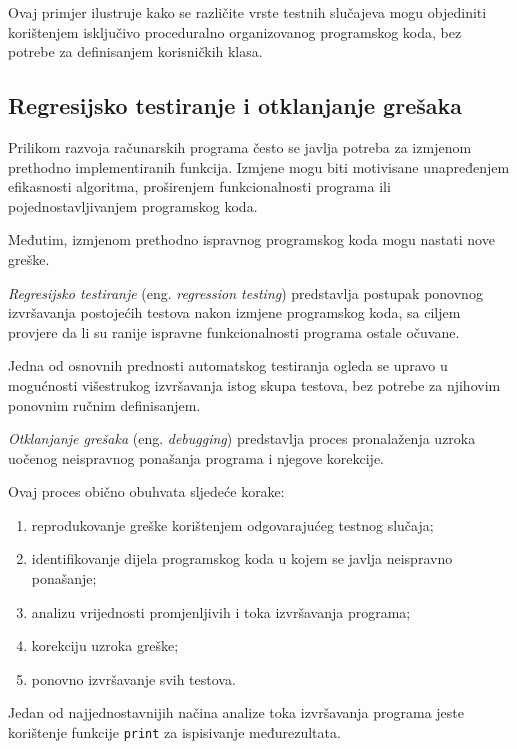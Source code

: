 Ovaj primjer ilustruje kako se različite vrste 
testnih slučajeva mogu objediniti korištenjem 
isključivo proceduralno organizovanog programskog 
koda, bez potrebe za definisanjem korisničkih klasa.


\subsection{Regresijsko testiranje i otklanjanje grešaka}

Prilikom razvoja računarskih programa često se 
javlja potreba za izmjenom prethodno implementiranih 
funkcija. Izmjene mogu biti motivisane unapređenjem 
efikasnosti algoritma, proširenjem funkcionalnosti 
programa ili pojednostavljivanjem programskog koda.

Međutim, izmjenom prethodno ispravnog programskog 
koda mogu nastati nove greške.

\textit{Regresijsko testiranje} (eng. \emph{regression 
	testing}) predstavlja postupak ponovnog izvršavanja 
postojećih testova nakon izmjene programskog koda, 
sa ciljem provjere da li su ranije ispravne 
funkcionalnosti programa ostale očuvane.

Jedna od osnovnih prednosti automatskog testiranja 
ogleda se upravo u mogućnosti višestrukog izvršavanja 
istog skupa testova, bez potrebe za njihovim ponovnim 
ručnim definisanjem.

\textit{Otklanjanje grešaka} (eng. \emph{debugging}) 
predstavlja proces pronalaženja uzroka uočenog 
neispravnog ponašanja programa i njegove korekcije.

Ovaj proces obično obuhvata sljedeće korake:

\begin{enumerate}
	\item reprodukovanje greške korištenjem 
	odgovarajućeg testnog slučaja;
	
	\item identifikovanje dijela programskog koda 
	u kojem se javlja neispravno ponašanje;
	
	\item analizu vrijednosti promjenljivih i toka 
	izvršavanja programa;
	
	\item korekciju uzroka greške;
	
	\item ponovno izvršavanje svih testova.
\end{enumerate}

Jedan od najjednostavnijih načina analize toka 
izvršavanja programa jeste korištenje funkcije 
\texttt{print} za ispisivanje međurezultata.

